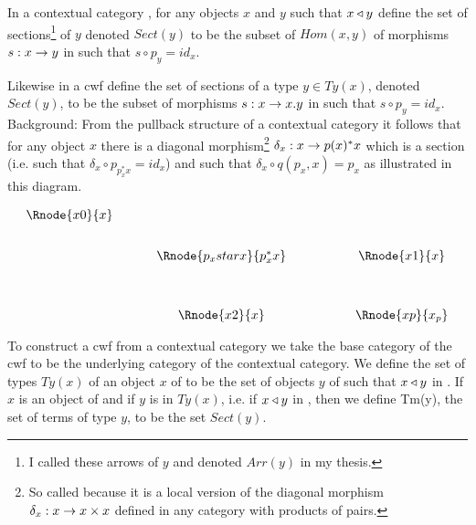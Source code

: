 \note In a contextual category \catcw, for any objects $x$ and $y$ such that $x \triangleleft y$ define
the set of sections\footnote{I called these arrows of $y$ and denoted $Arr(y)$ in my thesis.} of $y$ denoted $Sect(y)$ to be the subset of $Hom(x,y)$ of morphisms
$s:x \rightarrow y$ in \catcw such that $s \circ p_y = id_x$. 

Likewise in a cwf \catcw define the set of sections of a 
type $y \in Ty(x)$, denoted $Sect(y)$,
to be the subset of morphisms $s: x \rightarrow x.y$ in \catcw such that $s \circ p_y = id_x$. \\

\note 
Background: From the pullback structure of  a contextual category it follows that for any
object $x$ there is a diagonal morphism\footnote{So called because it is a local version of the diagonal 
morphism $\delta_x:x \rightarrow x \times x$  defined in any category with products of pairs.}
$\delta_x : x \rightarrow p(x)^*x$ which is a section (i.e. such that $\delta_x \circ p_{p_x^*x} = id_x$) and such that $\delta_x \circ q(p_x,x)=p_x$ as illustrated in this diagram.

\vspace{3mm}
\begin{center}
\begin{equation*}
\label{pullback}
\begin{array}{cp{0.5cm}cp{1.2cm}c}
\Rnode{x0}{x} &&                     &&           \\ [0.7cm]
             &&\Rnode{p_xstarx}{p_x^*x} && \Rnode{x1}{x}\\ [1.2cm]
             &&\Rnode{x2}{x}         && \Rnode{xp}{x_p}
\end{array}
\end{equation*}
\setlength{\arrnodesepA}{3pt}
\end{center}

\note To construct a cwf from a contextual category we take the base category of the cwf to be the underlying category of the contextual category. We define the set of types $Ty(x)$ of an object 
$x$ of \catcw to be the set of objects $y$ of \catcw such that $x \triangleleft y$ in \catc. 
If $x$ is an object of \catcw and if $y$ is in $Ty(x)$, i.e. if $x \triangleleft y$ in \catc, then
we define Tm(y), the set of terms of type $y$, to be the set $Sect(y)$.


